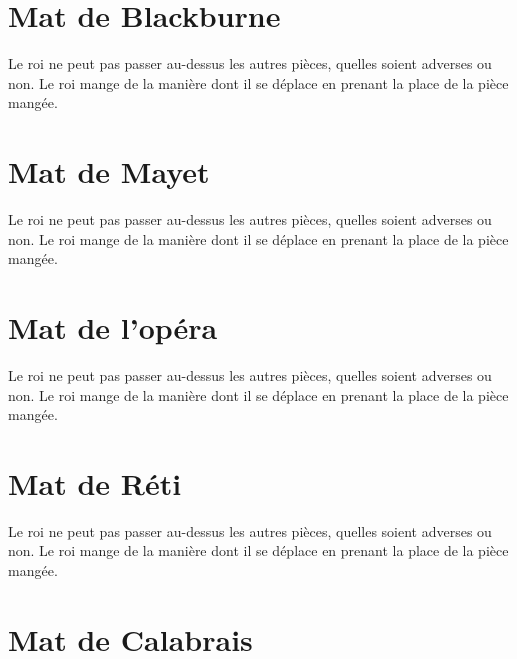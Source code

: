 \documentclass[a5paper,openany,twocolumn]{book}
\begin{document}
{%
 
\chapter{Mat de Blackburne}

Le roi ne peut pas passer au-dessus les autres pièces, quelles soient adverses ou non. Le roi mange de la manière dont il se déplace en prenant la place de la pièce mangée. 


\chapter{Mat de Mayet}

Le roi ne peut pas passer au-dessus les autres pièces, quelles soient adverses ou non. Le roi mange de la manière dont il se déplace en prenant la place de la pièce mangée. 

 
\chapter{Mat de l'opéra}

Le roi ne peut pas passer au-dessus les autres pièces, quelles soient adverses ou non. Le roi mange de la manière dont il se déplace en prenant la place de la pièce mangée. 


\chapter{Mat de Réti}

Le roi ne peut pas passer au-dessus les autres pièces, quelles soient adverses ou non. Le roi mange de la manière dont il se déplace en prenant la place de la pièce mangée. 

 
\chapter{Mat de Calabrais}

}
\end{document}
